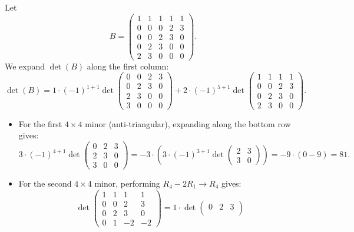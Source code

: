 \begin{exercisesolution*}
\label{sol:determinant_5x5_laplace}
Let
\[
B = \begin{pmatrix}
  1 & 1 & 1 & 1 & 1 \\
  0 & 0 & 0 & 2 & 3 \\
  0 & 0 & 2 & 3 & 0 \\
  0 & 2 & 3 & 0 & 0 \\
  2 & 3 & 0 & 0 & 0
\end{pmatrix}.
\]
We expand $\det(B)$ along the first column:
\[
\det(B) = 1 \cdot (-1)^{1+1} \det \begin{pmatrix}
  0 & 0 & 2 & 3 \\
  0 & 2 & 3 & 0 \\
  2 & 3 & 0 & 0 \\
  3 & 0 & 0 & 0
\end{pmatrix} + 2 \cdot (-1)^{5+1} \det \begin{pmatrix}
  1 & 1 & 1 & 1 \\
  0 & 0 & 2 & 3 \\
  0 & 2 & 3 & 0 \\
  2 & 3 & 0 & 0
\end{pmatrix}.
\]
\begin{itemize}
    \item For the first $4 \times 4$ minor (anti-triangular), expanding along the bottom row gives:
    \[
    3 \cdot (-1)^{4+1} \det \begin{pmatrix} 0 & 2 & 3 \\ 2 & 3 & 0 \\ 3 & 0 & 0 \end{pmatrix} = -3 \cdot \left( 3 \cdot (-1)^{3+1} \det \begin{pmatrix} 2 & 3 \\ 3 & 0 \end{pmatrix} \right) = -9 \cdot (0 - 9) = 81.
    \]
    \item For the second $4 \times 4$ minor, performing $R_4 - 2R_1 \to R_4$ gives:
    \[
    \det \begin{pmatrix}
      1 & 1 & 1 & 1 \\
      0 & 0 & 2 & 3 \\
      0 & 2 & 3 & 0 \\
      0 & 1 & -2 & -2
    \end{pmatrix}
    = 1 \cdot \det \begin{pmatrix}
      0 & 2 & 3 \\

\end{pmatrix}\]
\end{itemize}
\end{exercisesolution*}
